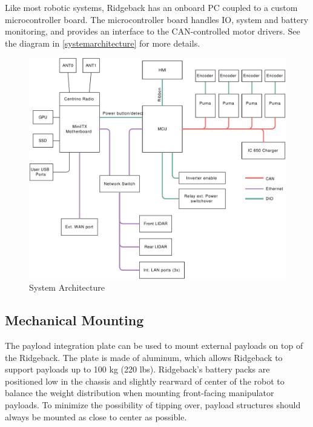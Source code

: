 \documentclass[]{clearpath-latex/clearpath-manual}
\begin{document}
Like most robotic systems, Ridgeback has an onboard PC coupled to a custom microcontroller board. The microcontroller board handles IO, system and battery monitoring, and provides an interface to the CAN-controlled motor drivers. See the diagram in \autoref{systemarchitecture} for more details.

\begin{figure}[!htb]
  \centering
  \includegraphics[width=0.75\linewidth]{ridgeback-logic-conn.pdf}
  \caption{System Architecture}
  \label{systemarchitecture}
\end{figure}

\pagebreak[4]
\subsection{Mechanical Mounting}
\label{mechanical}

The payload integration plate can be used to mount external payloads on top of the Ridgeback.   The plate is made of aluminum, which allows Ridgeback to support payloads up to 100 kg (220 lbs).   Ridgeback's battery packs are positioned low in the chassis and slightly rearward of center of the robot to balance the weight distribution when mounting front-facing manipulator payloads. To minimize the possibility of tipping over, payload structures should always be mounted as close to center as possible.
\end{document}
